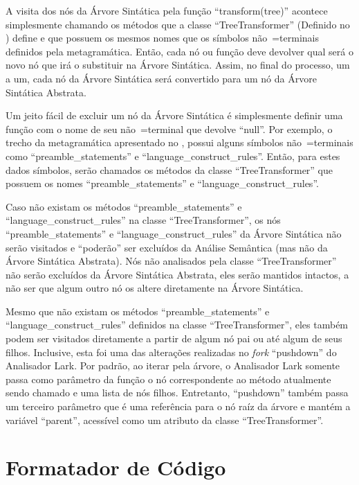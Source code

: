 A visita dos nós da Árvore Sintática pela função ``transform(tree)'' acontece simplesmente chamando os métodos que a classe ``TreeTransformer'' (Definido no ) define e
que possuem os mesmos nomes que os símbolos não~=terminais definidos pela metagramática.
Então,
cada nó ou
função deve devolver qual será o novo nó que irá o substituir na Árvore Sintática.
Assim,
no final do processo,
um a um,
cada nó da Árvore Sintática será convertido para um nó da Árvore Sintática Abstrata.

Um jeito fácil de excluir um nó da Árvore Sintática é simplesmente definir uma função com o nome de seu não~=terminal que devolve ``null''.
Por exemplo,
o trecho da metagramática apresentado no ,
possui alguns símbolos não~=terminais como ``preamble\_statements'' e
``language\_construct\_rules''. Então,
para estes dados símbolos,
serão chamados os métodos da classe ``TreeTransformer'' que possuem os nomes ``preamble\_statements'' e
``language\_construct\_rules''.

Caso não existam os métodos ``preamble\_statements'' e
``language\_construct\_rules'' na classe ``TreeTransformer'',
os nós ``preamble\_statements'' e
``language\_construct\_rules'' da Árvore Sintática não serão visitados e
``poderão'' ser excluídos da Análise Semântica (mas não da Árvore Sintática Abstrata).
Nós não analisados pela classe ``TreeTransformer'' não serão excluídos da Árvore Sintática Abstrata,
eles serão mantidos intactos,
a não ser que algum outro nó os altere diretamente na Árvore Sintática.

Mesmo que não existam os métodos ``preamble\_statements'' e
``language\_construct\_rules'' definidos na classe ``TreeTransformer'',
eles também podem ser visitados diretamente a partir de algum nó pai ou
até algum de seus filhos.
Inclusive,
esta foi uma das alterações realizadas no \textit{fork} ``pushdown'' do Analisador Lark.
Por padrão,
ao iterar pela árvore,
o Analisador Lark somente passa como parâmetro da função o nó correspondente ao método atualmente sendo chamado e
uma lista de nós filhos.
Entretanto,
``pushdown'' também passa um terceiro parâmetro que é uma referência para o nó raíz da árvore e
mantém a variável ``parent'',
acessível como um atributo da classe ``TreeTransformer''.


\section{Formatador de Código}
\label{desempenhoDoFormator}

